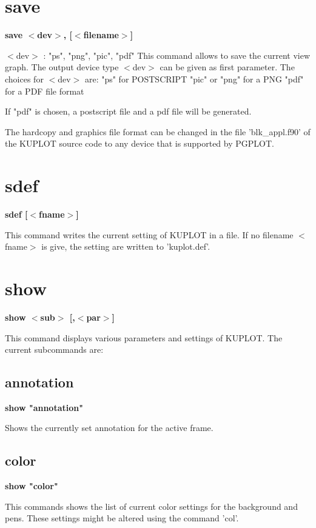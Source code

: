 \section{save}
{\bf save $ <$dev$> $, [$ <$filename$> $] \par }
\par
\vspace{3pt}
$ <$dev$> $ : "ps", "png", "pic", "pdf" 
This command allows to save the current view graph. The output 
device type $ <$dev$> $ can be given as first parameter. The 
choices for $ <$dev$> $ are: 
"ps" for POSTSCRIPT 
"pic" or "png" for a PNG 
"pdf" for a PDF file format 
\par
If "pdf" is chosen, a postscript file and a pdf file will be generated. 
\par
The hardcopy and graphics file format 
can be changed in the file 'blk\_appl.f90' of the KUPLOT source code 
to any device that is supported by PGPLOT. 
\section{sdef}
{\bf sdef [$ <$fname$> $] \par }
\par
\vspace{3pt}
This command writes the current setting of KUPLOT in a file. If 
no filename $ <$fname$> $ is give, the setting are written to 'kuplot.def'. 
\section{show}
{\bf show $ <$sub$> $ [,$ <$par$> $] \par }
\par
\vspace{3pt}
This command displays various parameters and settings of KUPLOT. 
The current subcommands are: 
\par
\subsection*{annotation}
{\bf show "annotation" \par }
\par
\vspace{3pt}
Shows the currently set annotation for the active frame. 
\subsection*{color}
{\bf show "color" \par }
\par
\vspace{3pt}
This commands shows the list of current color settings for the 
background and pens. These settings might be altered using the 
command 'col'. 
